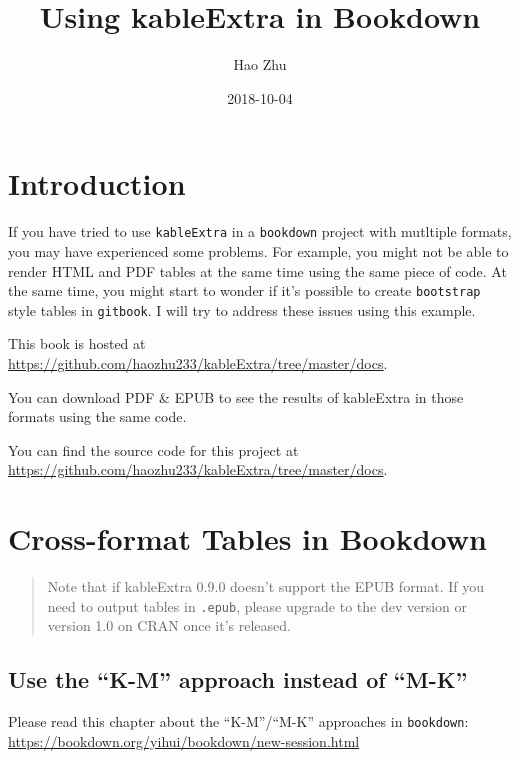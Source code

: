 \documentclass[]{book}
\title{Using kableExtra in Bookdown}
\author{Hao Zhu}
\date{2018-10-04}
\begin{document}
\maketitle

{
\setcounter{tocdepth}{1}
\tableofcontents
}
\hypertarget{introduction}{%
\chapter{Introduction}\label{introduction}}

If you have tried to use \texttt{kableExtra} in a \texttt{bookdown}
project with mutltiple formats, you may have experienced some problems.
For example, you might not be able to render HTML and PDF tables at the
same time using the same piece of code. At the same time, you might
start to wonder if it's possible to create \texttt{bootstrap} style
tables in \texttt{gitbook}. I will try to address these issues using
this example.

This book is hosted at
\url{https://github.com/haozhu233/kableExtra/tree/master/docs}.

You can download PDF \& EPUB to see the results of kableExtra in those
formats using the same code.

You can find the source code for this project at
\url{https://github.com/haozhu233/kableExtra/tree/master/docs}.

\hypertarget{cross-format-tables-in-bookdown}{%
\chapter{Cross-format Tables in
Bookdown}\label{cross-format-tables-in-bookdown}}

\begin{quote}
Note that if kableExtra 0.9.0 doesn't support the EPUB format. If you
need to output tables in \texttt{.epub}, please upgrade to the dev
version or version 1.0 on CRAN once it's released.
\end{quote}

\hypertarget{use-the-k-m-approach-instead-of-m-k}{%
\section{Use the ``K-M'' approach instead of
``M-K''}\label{use-the-k-m-approach-instead-of-m-k}}

Please read this chapter about the ``K-M''/``M-K'' approaches in
\texttt{bookdown}:
\url{https://bookdown.org/yihui/bookdown/new-session.html}
\end{document}
